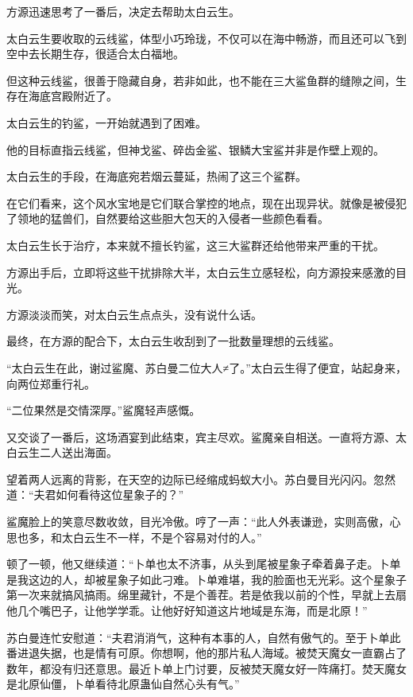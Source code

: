 
\begin{this_body}

方源迅速思考了一番后，决定去帮助太白云生。

太白云生要收取的云线鲨，体型小巧玲珑，不仅可以在海中畅游，而且还可以飞到空中去长期生存，很适合太白福地。

但这种云线鲨，很善于隐藏自身，若非如此，也不能在三大鲨鱼群的缝隙之间，生存在海底宫殿附近了。

太白云生的钓鲨，一开始就遇到了困难。

他的目标直指云线鲨，但神戈鲨、碎齿金鲨、银鳞大宝鲨并非是作壁上观的。

太白云生的手段，在海底宛若烟云蔓延，热闹了这三个鲨群。

在它们看来，这个风水宝地是它们联合掌控的地点，现在出现异状。就像是被侵犯了领地的猛兽们，自然要给这些胆大包天的入侵者一些颜色看看。

太白云生长于治疗，本来就不擅长钓鲨，这三大鲨群还给他带来严重的干扰。

方源出手后，立即将这些干扰排除大半，太白云生立感轻松，向方源投来感激的目光。

方源淡淡而笑，对太白云生点点头，没有说什么话。

最终，在方源的配合下，太白云生收刮到了一批数量理想的云线鲨。

“太白云生在此，谢过鲨魔、苏白曼二位大人≠了。”太白云生得了便宜，站起身来，向两位郑重行礼。

“二位果然是交情深厚。”鲨魔轻声感慨。

又交谈了一番后，这场酒宴到此结束，宾主尽欢。鲨魔亲自相送。一直将方源、太白云生二人送出海面。

望着两人远离的背影，在天空的边际已经缩成蚂蚁大小。苏白曼目光闪闪。忽然道：“夫君如何看待这位星象子的？”

鲨魔脸上的笑意尽数收敛，目光冷傲。哼了一声：“此人外表谦逊，实则高傲，心思也多，和太白云生不一样，不是个容易对付的人。”

顿了一顿，他又继续道：“卜单也太不济事，从头到尾被星象子牵着鼻子走。卜单是我这边的人，却被星象子如此刁难。卜单难堪，我的脸面也无光彩。这个星象子第一次来就搞风搞雨。绵里藏针，不是个善茬。若是依我以前的个性，早就上去扇他几个嘴巴子，让他学学乖。让他好好知道这片地域是东海，而是北原！”

苏白曼连忙安慰道：“夫君消消气，这种有本事的人，自然有傲气的。至于卜单此番进退失据，也是情有可原。你想啊，他的那片私人海域。被焚天魔女一直霸占了数年，都没有归还意思。最近卜单上门讨要，反被焚天魔女好一阵痛打。焚天魔女是北原仙僵，卜单看待北原蛊仙自然心头有气。”


\end{this_body}

